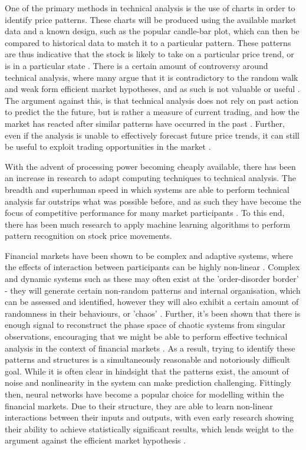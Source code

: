 \documentclass[a4paper,11pt,oneside]{article}
\theoremstyle{plain}
\theoremstyle{definition}
\begin{document}
One of the primary methods in technical analysis is the use of charts in order to identify price patterns. 
These charts will be produced using the available market data and a known design, such as the popular candle-bar 
plot, which can then be compared to historical data to match it to a particular pattern. These patterns are thus 
indicative that the stock is likely to take on a particular price trend, or is in a particular state \cite {Murphy}.  
There is a certain amount of controversy around technical analysis, where many argue that it is contradictory 
to the random walk and weak form efficient market hypotheses, and as such is not valuable or useful \cite {Griffioen}. 
The argument against this, is that technical analysis does not rely on past action to predict the the future, but is 
rather a measure of current trading, and how the market has reacted after similar patterns have occurred in the 
past \cite {Kahn}. Further, even if the analysis is unable to effectively forecast future price trends, it can still be useful 
to exploit trading opportunities in the market \cite{Schwager}.
\hfill \break 

With the advent of processing power becoming cheaply available, there has been an increase in research to 
adapt computing techniques to technical analysis. The breadth and superhuman speed in which systems are 
able to perform technical analysis far outstrips what was possible before, and as such they have become the 
focus of competitive performance for many market participants \cite {Johnson}. To this end, there has been much 
research to apply machine learning algorithms to perform pattern recognition on stock price movements.
\hfill \break

Financial markets have been shown to be complex and adaptive systems, where the effects of interaction 
between participants can be highly non-linear \cite {Arthur}. Complex and dynamic systems such as these may 
often exist at the 'order-disorder border' - they will generate certain non-random patterns and internal organisation, 
which can be assessed and identified, however they will also exhibit a certain amount of randomness in their behaviours, 
or 'chaos' \cite {Crutchfield}. Further, it's been shown that there is enough signal to reconstruct 
the phase space of chaotic systems from singular observations, encouraging that we might be able to perform 
effective technical analysis in the context of financial markets \cite{Packard, Takens}. As a result, trying to identify these patterns and structures is a simultaneously 
reasonable and notoriously difficult goal. While it is often clear in hindsight that the patterns exist, the amount of 
noise and nonlinearity in the system can make prediction challenging.
Fittingly then, neural networks have become a popular choice for modelling within the financial markets. Due to 
their structure, they are able to learn non-linear interactions between their inputs and outputs, with even early research 
showing their ability to achieve statistically significant results, which lends weight to the 
argument against the efficient market hypothesis \cite {Skabar}. 
\hfill \break
\end{document}
